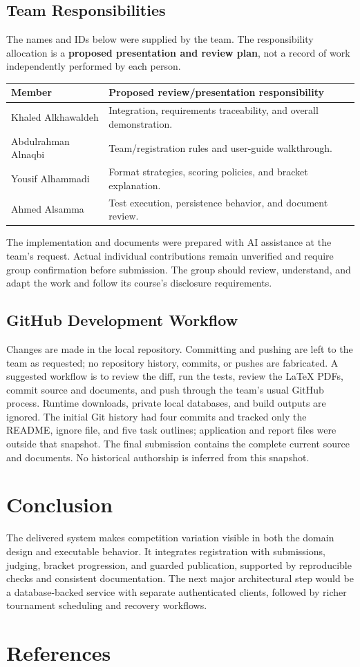 \documentclass[12pt]{article}
\begin{document}
\subsection{Team Responsibilities}
The names and IDs below were supplied by the team. The responsibility allocation is a \textbf{proposed presentation and review plan}, not a record of work independently performed by each person.

\begin{tabularx}{\linewidth}{lY}\toprule Member & Proposed review/presentation responsibility\\\midrule
Khaled Alkhawaldeh & Integration, requirements traceability, and overall demonstration.\\
Abdulrahman Alnaqbi & Team/registration rules and user-guide walkthrough.\\
Yousif Alhammadi & Format strategies, scoring policies, and bracket explanation.\\
Ahmed Alsamma & Test execution, persistence behavior, and document review.\\\bottomrule\end{tabularx}

The implementation and documents were prepared with AI assistance at the team's request. Actual individual contributions remain unverified and require group confirmation before submission. The group should review, understand, and adapt the work and follow its course's disclosure requirements.
\subsection{GitHub Development Workflow}
Changes are made in the local repository. Committing and pushing are left to the team as requested; no repository history, commits, or pushes are fabricated. A suggested workflow is to review the diff, run the tests, review the LaTeX PDFs, commit source and documents, and push through the team's usual GitHub process. Runtime downloads, private local databases, and build outputs are ignored. The initial Git history had four commits and tracked only the README, ignore file, and five task outlines; application and report files were outside that snapshot. The final submission contains the complete current source and documents. No historical authorship is inferred from this snapshot.

\section{Conclusion}
The delivered system makes competition variation visible in both the domain design and executable behavior. It integrates registration with submissions, judging, bracket progression, and guarded publication, supported by reproducible checks and consistent documentation. The next major architectural step would be a database-backed service with separate authenticated clients, followed by richer tournament scheduling and recovery workflows.
\clearpage\section{References}

\end{document}
